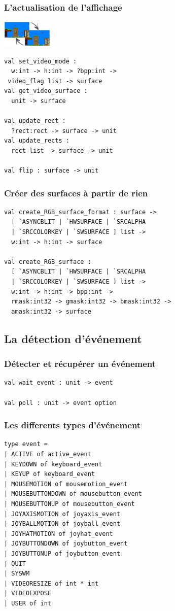 \begin{frame}[fragile]
	\frametitle{L'actualisation de l'affichage}
	\begin{center}
		\includegraphics[width=2.4cm]{pics/doubleBufferScreen.png}
	\end{center}
	\begin{lstlisting}
val set_video_mode : 
  w:int -> h:int -> ?bpp:int -> 
 video_flag list -> surface
val get_video_surface : 
  unit -> surface

val update_rect : 
  ?rect:rect -> surface -> unit
val update_rects : 
  rect list -> surface -> unit

val flip : surface -> unit
	\end{lstlisting}
\end{frame}

\begin{frame}[fragile]
	\frametitle{Créer des surfaces à partir de rien}
	\lstset{basicstyle=\footnotesize}
	\begin{lstlisting}
val create_RGB_surface_format : surface ->
  [ `ASYNCBLIT | `HWSURFACE | `SRCALPHA 
  | `SRCCOLORKEY | `SWSURFACE ] list ->
  w:int -> h:int -> surface

val create_RGB_surface : 
  [ `ASYNCBLIT | `HWSURFACE | `SRCALPHA 
  | `SRCCOLORKEY | `SWSURFACE ] list ->
  w:int -> h:int -> bpp:int ->
  rmask:int32 -> gmask:int32 -> bmask:int32 ->
  amask:int32 -> surface
	\end{lstlisting}
\end{frame}

\subsection{La détection d'événement} %
\begin{frame}[fragile]
	\frametitle{Détecter et récupérer un événement}
	\begin{lstlisting}
val wait_event : unit -> event

val poll : unit -> event option
	\end{lstlisting}
\end{frame}

\begin{frame}[fragile]
	\frametitle{Les differents types d'événement}
	\lstset{basicstyle=\small}
	\begin{lstlisting}
type event =
| ACTIVE of active_event
| KEYDOWN of keyboard_event
| KEYUP of keyboard_event
| MOUSEMOTION of mousemotion_event
| MOUSEBUTTONDOWN of mousebutton_event
| MOUSEBUTTONUP of mousebutton_event
| JOYAXISMOTION of joyaxis_event
| JOYBALLMOTION of joyball_event
| JOYHATMOTION of joyhat_event
| JOYBUTTONDOWN of joybutton_event
| JOYBUTTONUP of joybutton_event
| QUIT
| SYSWM
| VIDEORESIZE of int * int
| VIDEOEXPOSE
| USER of int
	\end{lstlisting}
\end{frame}

